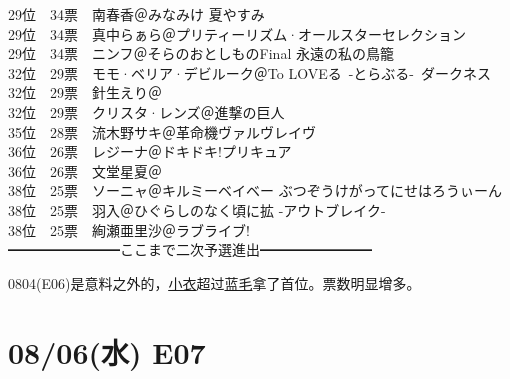 {    29位　34票　南春香＠みなみけ 夏やすみ\\
    29位　34票　真中らぁら＠プリティーリズム·オールスターセレクション\\
    29位　34票　ニンフ＠そらのおとしものFinal 永遠の私の鳥籠\\
    32位　29票　モモ·ベリア·デビルーク＠To LOVEる~-とらぶる-~ダークネス\\
    32位　29票　針生えり＠\Saki\\
    32位　29票　クリスタ·レンズ＠進撃の巨人\\
    35位　28票　流木野サキ＠革命機ヴァルヴレイヴ\\
    36位　26票　レジーナ＠ドキドキ!プリキュア\\
    36位　26票　文堂星夏＠\Saki\\
    38位　25票　ソーニャ＠キルミーベイベー ぶつぞうけがってにせはろうぃーん\\
    38位　25票　羽入＠ひぐらしのなく頃に拡 -アウトブレイク-\\
    38位　25票　絢瀬亜里沙＠ラブライブ!\\
    ━━━━━━━━ここまで二次予選進出━━━━━━━━
}

0804(E06)是意料之外的，\uline{\uline{小衣}}超过\uline{蓝毛}拿了首位。票数明显增多。

\section{08/06(水) E07}


